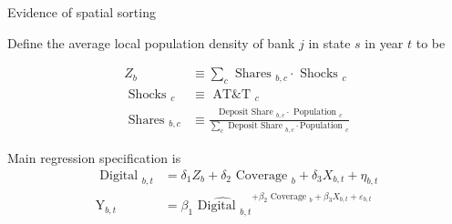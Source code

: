 \documentclass[notes,10pt, aspectratio=169]{beamer}
\newenvironment{wideitemize}{\itemize\addtolength{\itemsep}{10pt}}{\enditemize}
\begin{document}
\begin{frame}{Evidence of spatial sorting}

\begin{wideitemize}
\item Define the average local population density of bank $j$ in state $s$ in year $t$ to be

$$
\begin{aligned}
    Z_b & \equiv \sum_c \text { Shares }_{b, c} \cdot \text { Shocks }_c \\
    \text { Shocks }_c & \equiv \text { AT\&T }_c \\
    \text { Shares }_{b, c} & \equiv \frac{\text { Deposit Share }_{b, c} \cdot \text { Population }_c}{\sum_c \text { Deposit Share }_{b, c} \cdot \text {Population }_c}
    \end{aligned}
$$


\item  Main regression specification is
$$
\begin{aligned}
    \text { Digital }_{b, t} & =\delta_1 Z_b+\delta_2 \text { Coverage }_b+\delta_3 X_{b, t}+\eta_{b, t} \\
    \mathrm{Y}_{b, t} & =\beta_1{\widehat{\text { Digital }_{b, t}}}^{+\beta_2 \text { Coverage }_b+\beta_3 X_{b, t}+\varepsilon_{b, t}}
    \end{aligned}
$$



\end{wideitemize}
\end{frame}
\end{document}
